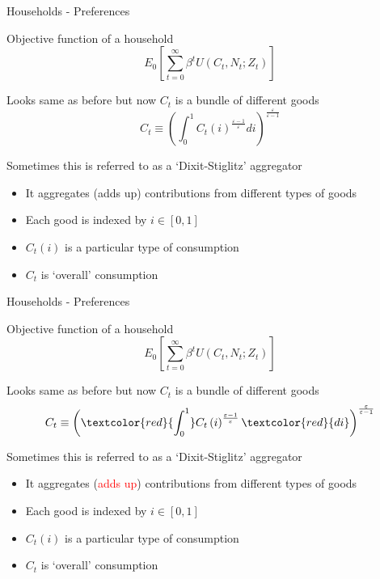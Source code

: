 \documentclass{beamer}
\begin{document}
\begin{frame}{Households - Preferences}

Objective function of a household
\begin{equation*}
E_{0} \left[ \sum\limits_{t=0}^{\infty} \beta^{t} U \left( C_{t}, N_{t}; Z_{t} \right) \right]
\end{equation*}

Looks same as before but now $C_{t}$ is a bundle of different goods
\begin{equation}
C_{t} \equiv \left( \int_{0}^{1} C_{t}\left( i \right)^{\frac{\varepsilon-1}{\varepsilon}} di \right)^{\frac{\varepsilon}{\varepsilon-1}} \label{eqn:ds_aggregator}
\end{equation}

Sometimes this is referred to as a `Dixit-Stiglitz' aggregator
\begin{itemize}
\item	It aggregates (adds up) contributions from different types of goods
\item	Each good is indexed by $i\in[0,1]$
\item	$C_{t}(i)$ is a particular type of consumption
\item	$C_{t}$ is `overall' consumption
\end{itemize}

\end{frame}


	
\begin{frame}{Households - Preferences}

Objective function of a household
\begin{equation*}
E_{0} \left[ \sum\limits_{t=0}^{\infty} \beta^{t} U \left( C_{t}, N_{t}; Z_{t} \right) \right]
\end{equation*}

Looks same as before but now $C_{t}$ is a bundle of different goods
\begin{equation}
C_{t} \equiv \left( \textcolor{red}{\int_{0}^{1}} C_{t}\left( i \right)^{\frac{\varepsilon-1}{\varepsilon}} \textcolor{red}{di} \right)^{\frac{\varepsilon}{\varepsilon-1}} \label{eqn:ds_aggregator}
\end{equation}

Sometimes this is referred to as a `Dixit-Stiglitz' aggregator
\begin{itemize}
\item	It aggregates (\textcolor{red}{adds up}) contributions from different types of goods
\item	Each good is indexed by $i\in[0,1]$
\item	$C_{t}(i)$ is a particular type of consumption
\item	$C_{t}$ is `overall' consumption
\end{itemize}

\end{frame}
\end{document}

